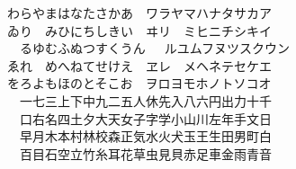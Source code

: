 \documentclass[17pt]{extarticle}
\begin{document}
\noindent{}%
わらやまはなたさかあ~~ワラヤマハナタサカア\\
ゐり~~みひにちしきい~~ヰリ~~ミヒニチシキイ\\%
　るゆむふぬつすくうん~~~ルユムフヌツスクウン\\
ゑれ~~めへねてせけえ~~ヱレ~~メヘネテセケエ\\
をろよもほのとそこお~~ヲロヨモホノトソコオ\\
　一七三上下中九二五人休先入八六円出力十千\\
　口右名四土夕大天女子字学小山川左年手文日\\
　早月木本村林校森正気水火犬玉王生田男町白\\
　百目石空立竹糸耳花草虫見貝赤足車金雨青音
\end{document}
